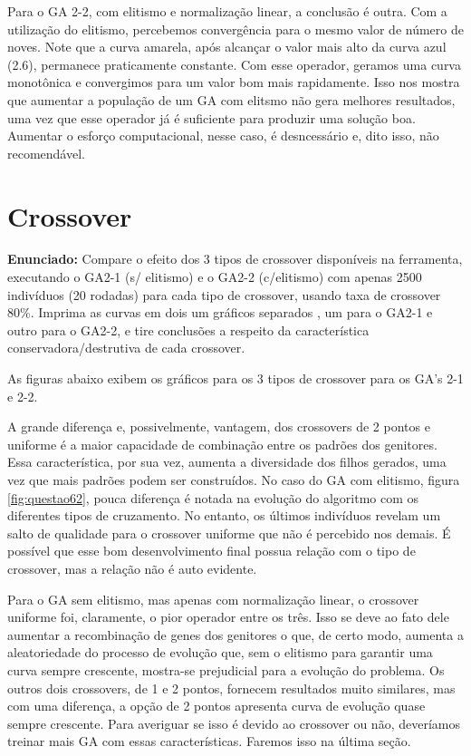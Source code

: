\documentclass[12pt]{article}
\begin{document}
Para o GA 2-2, com elitismo e normalização linear, a conclusão é outra. Com a utilização do elitismo, percebemos convergência para o mesmo valor de número de noves. Note que a curva amarela, após alcançar o valor mais alto da curva azul (2.6), permanece praticamente constante. Com esse operador, geramos uma curva monotônica e convergimos para um valor bom mais rapidamente. Isso nos mostra que aumentar a população de um GA com elitsmo não gera melhores resultados, uma vez que esse operador já é suficiente para produzir uma solução boa. Aumentar o esforço computacional, nesse caso, é desncessário e, dito isso, não recomendável.

\section{Crossover}
\textbf{Enunciado:}
Compare o efeito dos 3 tipos de crossover disponíveis na ferramenta, executando o GA2-1 (s/ elitismo) e o GA2-2 (c/elitismo) com apenas 2500 indivíduos (20 rodadas) para cada tipo de crossover, usando taxa de crossover 80\%. Imprima as curvas em dois um gráficos separados , um para o GA2-1 e outro para o GA2-2, e tire conclusões a respeito da característica conservadora/destrutiva de cada crossover.

As figuras abaixo exibem os gráficos para os 3 tipos de crossover para os GA's 2-1 e 2-2.

A grande diferença e, possivelmente, vantagem, dos crossovers de 2 pontos e uniforme é a maior capacidade de combinação entre os padrões dos genitores. Essa característica, por sua vez, aumenta a diversidade dos filhos gerados, uma vez que mais padrões podem ser construídos. No caso do GA com elitismo, figura \ref{fig:questao62}, pouca diferença é notada na evolução do algoritmo com os diferentes tipos de cruzamento. No entanto, os últimos indivíduos revelam um salto de qualidade para o crossover uniforme que não é percebido nos demais. É possível que esse bom desenvolvimento final possua relação com o tipo de crossover, mas a relação não é auto evidente.

Para o GA sem elitismo, mas apenas com normalização linear, o crossover uniforme foi, claramente, o pior operador entre os três. Isso se deve ao fato dele aumentar a recombinação de genes dos genitores o que, de certo modo, aumenta a aleatoriedade do processo de evolução que, sem o elitismo para garantir uma curva sempre crescente, mostra-se prejudicial para a evolução do problema. Os outros dois crossovers, de 1 e 2 pontos, fornecem resultados muito similares, mas com uma diferença, a opção de 2 pontos apresenta curva de evolução quase sempre crescente. Para averiguar se isso é devido ao crossover ou não, deveríamos treinar mais GA com essas características. Faremos isso na última seção.
\end{document}
